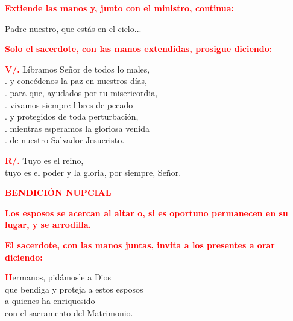 \documentclass[12pt, letterpaper, spanish]{report}
\begin{document}
\large{\bfseries \textcolor{red}{Extiende las manos y, junto con el ministro, continua:}}\newline

\Large Padre nuestro, que est\'as en el cielo...\newline

\large{\bfseries \textcolor{red}{Solo el sacerdote, con las manos extendidas, prosigue diciendo:}}\newline

\Large \hspace{-0.9cm} {\bfseries \textcolor{red}{V/.}} \hspace{0.5cm} L\'ibramos Se\~nor de todos lo males,\\
.\hspace{1.5cm} y conc\'edenos la paz en nuestros d\'ias,\\
.\hspace{1.5cm} para que, ayudados por tu misericordia,\\
.\hspace{1.5cm} vivamos siempre libres de pecado\\
.\hspace{1.5cm} y protegidos de toda perturbaci\'on,\\
.\hspace{1.5cm} mientras esperamos la gloriosa venida\\
.\hspace{1.5cm} de nuestro Salvador Jesucristo.\newline

\Large \hspace{-0.9cm} {\bfseries \textcolor{red}{R/.}} \hspace{0.5cm} Tuyo es el reino,\\
tuyo es el poder y la gloria, por siempre, Se\~nor.\newline

\newpage

\Large {\bfseries \textcolor{red}{BENDICI\'ON NUPCIAL}} \newline

\large{\bfseries \textcolor{red}{Los esposos se acercan al altar o, 
si es oportuno permanecen en su lugar, y se arrodilla.}}\newline

\large{\bfseries \textcolor{red}{El sacerdote, con las manos juntas, invita a los presentes a orar diciendo:}}\newline

\Large \lettrine{\bfseries \textcolor{red}{H}}{}ermanos, pid\'amosle a Dios\\
que bendiga y proteja a estos esposos\\
a quienes ha enriquesido\\
con el sacramento del Matrimonio.\newline
\end{document}
